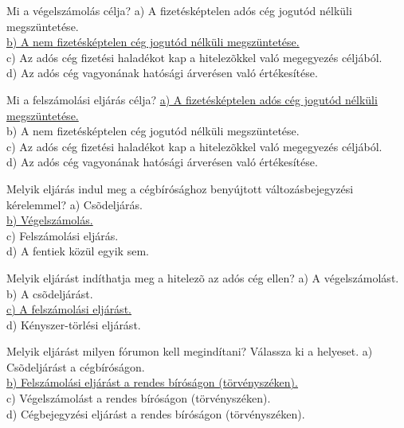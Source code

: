 \begin{frame}

\begin{tcolorbox}[title={106. Kérdés}]
Mi a végelszámolás célja?
\tcblower
a) A fizetésképtelen adós cég jogutód nélküli megszüntetése.\\
\uline {b) A nem fizetésképtelen cég jogutód nélküli megszüntetése.}\\
c) Az adós cég fizetési haladékot kap a hitelezõkkel való megegyezés céljából.\\
d) Az adós cég vagyonának hatósági árverésen való értékesítése.
\end{tcolorbox}

\begin{tcolorbox}[title={107. Kérdés}]
Mi a felszámolási eljárás célja?
\tcblower
\uline {a) A fizetésképtelen adós cég jogutód nélküli megszüntetése.}\\
b) A nem fizetésképtelen cég jogutód nélküli megszüntetése.\\
c) Az adós cég fizetési haladékot kap a hitelezõkkel való megegyezés céljából.\\
d) Az adós cég vagyonának hatósági árverésen való értékesítése.
\end{tcolorbox}

\begin{tcolorbox}[title={108. Kérdés}]
Melyik eljárás indul meg a cégbírósághoz benyújtott változásbejegyzési kérelemmel?
\tcblower
a) Csõdeljárás.\\
\uline {b) Végelszámolás.}\\
c) Felszámolási eljárás.\\
d) A fentiek közül egyik sem.
\end{tcolorbox}

\begin{tcolorbox}[title={109. Kérdés}]
Melyik eljárást indíthatja meg a hitelezõ az adós cég ellen?
\tcblower
a) A végelszámolást.\\
b) A csõdeljárást.\\
\uline {c) A felszámolási eljárást.}\\
d) Kényszer-törlési eljárást.
\end{tcolorbox}

\end{frame}


\begin{frame}

\begin{tcolorbox}[title={110. Kérdés}]
Melyik eljárást milyen fórumon kell megindítani? Válassza ki a helyeset.
\tcblower
a) Csõdeljárást a cégbíróságon.\\
\uline {b) Felszámolási eljárást a rendes bíróságon (törvényszéken).}\\
c) Végelszámolást a rendes bíróságon (törvényszéken).\\
d) Cégbejegyzési eljárást a rendes bíróságon (törvényszéken).
\end{tcolorbox}

\end{frame}

